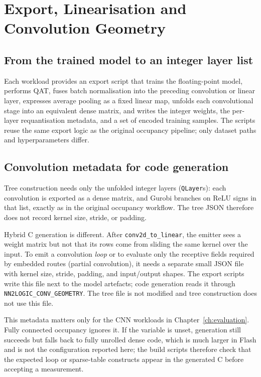 \section{Export, Linearisation and Convolution Geometry}
\label{sec:impl-export}

\subsection{From the trained model to an integer layer list}

Each workload provides an export script that trains the floating-point model, performs \ac{QAT}, fuses batch normalisation into the preceding convolution or linear layer, expresses average pooling as a fixed linear map, unfolds each convolutional stage into an equivalent dense matrix, and writes the integer weights, the per-layer requantisation metadata, and a set of encoded training samples.
The scripts reuse the same export logic as the original occupancy pipeline; only dataset paths and hyperparameters differ.

\subsection{Convolution metadata for code generation}

Tree construction needs only the unfolded integer layers (\texttt{QLayer}s): each convolution is exported as a dense matrix, and Gurobi branches on \ac{ReLU} signs in that list, exactly as in the original occupancy workflow.
The tree JSON therefore does not record kernel size, stride, or padding.

Hybrid C generation is different.
After \texttt{conv2d\_to\_linear}, the emitter sees a weight matrix but not that its rows come from sliding the same kernel over the input.
To emit a convolution \emph{loop} or to evaluate only the receptive fields required by embedded routes (partial convolution), it needs a separate small JSON file with kernel size, stride, padding, and input/output shapes.
The export scripts write this file next to the model artefacts; code generation reads it through \texttt{NN2LOGIC\_CONV\_GEOMETRY}.
The tree file is not modified and tree construction does not use this file.

This metadata matters only for the CNN workloads in Chapter~\ref{ch:evaluation}.
Fully connected occupancy ignores it.
If the variable is unset, generation still succeeds but falls back to fully unrolled dense code, which is much larger in Flash and is not the configuration reported here; the build scripts therefore check that the expected loop or sparse-table constructs appear in the generated C before accepting a measurement.


